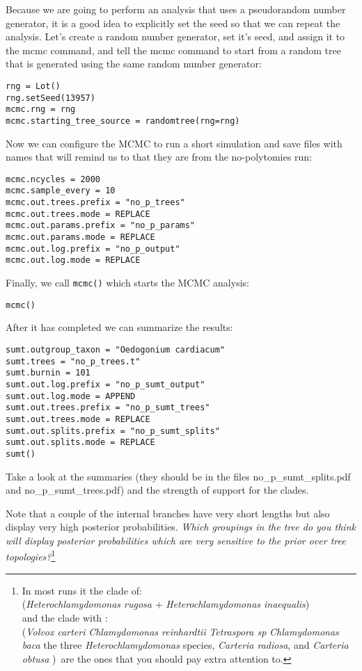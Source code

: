 \documentclass{article}
\newcommand{\cmd}[1]{\texttt{#1}\xspace}
\newcommand{\localfile}[1]{\textsf{#1}\xspace}
\newcommand{\QandA}[2]{\textit{#1}\footnote{#2}\xspace}
\begin{document}
Because we are going to perform an analysis that uses a pseudorandom number generator, it is a 
good idea to explicitly set the seed so that we can repeat the analysis.
Let's create a random number generator, set it's seed, and assign it to the mcmc command, and 
tell the mcmc command to start from a random tree that is generated using the same random
number generator:

\begin{verbatim}
rng = Lot()
rng.setSeed(13957)
mcmc.rng = rng
mcmc.starting_tree_source = randomtree(rng=rng)
\end{verbatim}

Now we can configure the MCMC to run a short simulation and save files with names that
will remind us to that they are from the no-polytomies run:
\begin{verbatim}
mcmc.ncycles = 2000
mcmc.sample_every = 10
mcmc.out.trees.prefix = "no_p_trees"
mcmc.out.trees.mode = REPLACE
mcmc.out.params.prefix = "no_p_params"
mcmc.out.params.mode = REPLACE
mcmc.out.log.prefix = "no_p_output"
mcmc.out.log.mode = REPLACE
\end{verbatim}

Finally, we call \cmd{mcmc()} which starts the MCMC analysis:
\begin{verbatim}
mcmc()
\end{verbatim}

After it has completed we can summarize the results:

\begin{verbatim}
sumt.outgroup_taxon = "Oedogonium cardiacum"
sumt.trees = "no_p_trees.t"
sumt.burnin = 101
sumt.out.log.prefix = "no_p_sumt_output"
sumt.out.log.mode = APPEND
sumt.out.trees.prefix = "no_p_sumt_trees"
sumt.out.trees.mode = REPLACE
sumt.out.splits.prefix = "no_p_sumt_splits"
sumt.out.splits.mode = REPLACE
sumt()
\end{verbatim}
Take a look at the summaries (they should be in the files \localfile{no\_p\_sumt\_splits.pdf} and \localfile{no\_p\_sumt\_trees.pdf}) and  the strength of support for the clades.

Note that a couple of the internal branches have very short lengths but 
also display very high posterior probabilities.  
\QandA{Which groupings in the tree do you think will display posterior probabilities
which are very sensitive to the prior over tree topologies?}{In most runs it the clade of:\\ ({\em Heterochlamydomonas rugosa} + {\em Heterochlamydomonas inaequalis})\\ 
and the clade with :\\ 
({\em Volvox carteri}
{\em Chlamydomonas reinhardtii }
{\em Tetraspora sp }
{\em Chlamydomonas baca}
the three {\em Heterochlamydomonas} species,
{\em Carteria radiosa}, and {\em Carteria obtusa }
)\
are the ones that you should pay extra attention to.}
\end{document}
